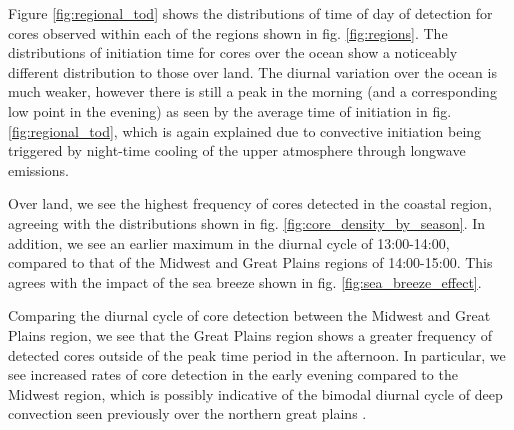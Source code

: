 

Figure \ref{fig:regional_tod} shows the distributions of time of day of detection for cores observed within each of the regions shown in fig. \ref{fig:regions}.
The distributions of initiation time for cores over the ocean show a noticeably different distribution to those over land.
The diurnal variation over the ocean is much weaker, however there is still a peak in the morning (and a corresponding low point in the evening) as seen by the average time of initiation in fig. \ref{fig:regional_tod}, which is again explained due to convective initiation being triggered by night-time cooling of the upper atmosphere through longwave emissions.

Over land, we see the highest frequency of cores detected in the coastal region, agreeing with the distributions shown in fig. \ref{fig:core_density_by_season}.
In addition, we see an earlier maximum in the diurnal cycle of 13:00-14:00, compared to that of the Midwest and Great Plains regions of 14:00-15:00.
This agrees with the impact of the sea breeze shown in fig. \ref{fig:sea_breeze_effect}.

Comparing the diurnal cycle of core detection between the Midwest and Great Plains region, we see that the Great Plains region shows a greater frequency of detected cores outside of the peak time period in the afternoon.
In particular, we see increased rates of core detection in the early evening compared to the Midwest region, which is possibly indicative of the bimodal diurnal cycle of deep convection seen previously over the northern great plains \citep{feng_spatiotemporal_2019, li_high-resolution_2021}.

